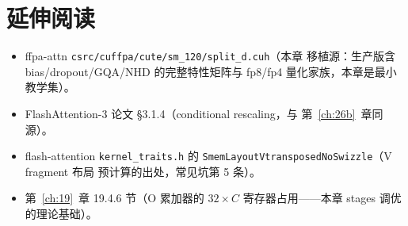 \section*{延伸阅读}

\begin{itemize}[itemsep=1pt]
  \item ffpa-attn \texttt{csrc/cuffpa/cute/sm\_120/split\_d.cuh}（本章
        移植源：生产版含 bias/dropout/GQA/NHD 的完整特性矩阵与
        fp8/fp4 量化家族，本章是最小教学集）。
  \item FlashAttention-3 论文 \S3.1.4（conditional rescaling，与
        第~\ref{ch:26b}~章同源）。
  \item flash-attention \texttt{kernel\_traits.h} 的
        \texttt{SmemLayoutVtransposedNoSwizzle}（V fragment 布局
        预计算的出处，常见坑第 5 条）。
  \item 第~\ref{ch:19}~章 19.4.6 节（O 累加器的 $32\times C$
        寄存器占用——本章 stages 调优的理论基础）。
\end{itemize}
